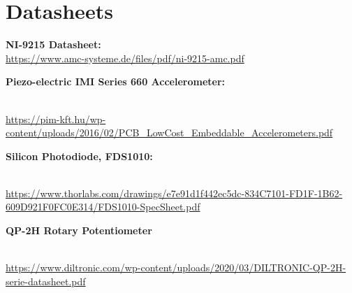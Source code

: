 \documentclass{article}
\begin{document}
\newpage
\begin{appendices}
\pagestyle{fancy}
\renewcommand{\thefigure}{A\arabic{figure}}
\setcounter{figure}{0}



\pagebreak

\hypertarget{datasheets}{}
\section{Datasheets}
\begin{enumerate}[label = {[\arabic*]}]
\small
\item \textbf{NI-9215 Datasheet:}\\[2pt] \url{https://www.amc-systeme.de/files/pdf/ni-9215-amc.pdf}
\item \hypertarget{2}{\textbf{Piezo-electric IMI Series 660 Accelerometer:}}\\[2pt] \url{https://pim-kft.hu/wp-content/uploads/2016/02/PCB_LowCost_Embeddable_Accelerometers.pdf}
\item \hypertarget{3}{\textbf{Silicon Photodiode, FDS1010:}}\\[2pt] \url{https://www.thorlabs.com/drawings/e7e91d1f442ec5dc-834C7101-FD1F-1B62-609D921F0FC0E314/FDS1010-SpecSheet.pdf}
\item \hypertarget{4}{\textbf{QP-2H Rotary Potentiometer}}\\[2pt] \url{https://www.diltronic.com/wp-content/uploads/2020/03/DILTRONIC-QP-2H-serie-datasheet.pdf}


\end{enumerate}

\end{appendices}
\end{document}
